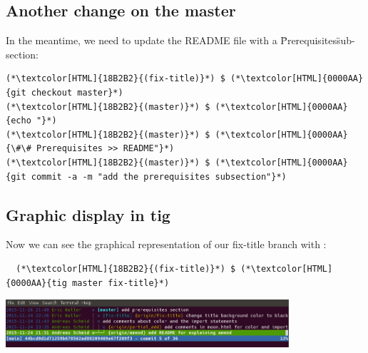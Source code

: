 \subsection{Another change on the master}
\begin{frame}[fragile]
  \subslidetitle

  In the meantime, we need to update the README file with a \"Prerequisites\" sub-section:
  \begin{lstlisting}
(*\textcolor[HTML]{18B2B2}{(fix-title)}*) $ (*\textcolor[HTML]{0000AA}{git checkout master}*)
(*\textcolor[HTML]{18B2B2}{(master)}*) $ (*\textcolor[HTML]{0000AA}{echo "}*)
(*\textcolor[HTML]{18B2B2}{(master)}*) $ (*\textcolor[HTML]{0000AA}{\#\# Prerequisites >> README"}*)
(*\textcolor[HTML]{18B2B2}{(master)}*) $ (*\textcolor[HTML]{0000AA}{git commit -a -m "add the prerequisites subsection"}*)
\end{lstlisting}

\end{frame}


\subsection{Graphic display in tig}
\begin{frame}[fragile]
  \subslidetitle

  Now we can see the graphical representation of our fix-title branch with :
  \begin{lstlisting}
  (*\textcolor[HTML]{18B2B2}{(fix-title)}*) $ (*\textcolor[HTML]{0000AA}{tig master fix-title}*)
\end{lstlisting}

  \vspace{1em}

  \centerline{\includegraphics[width=10.5cm]{../screen/tig-fix-title.png}}

\end{frame}





